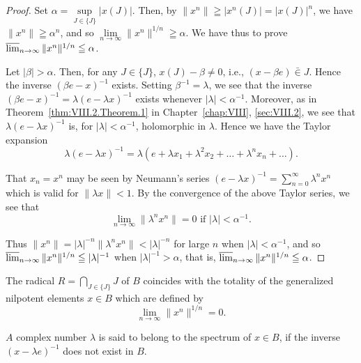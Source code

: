 \begin{proof}
 Set $\alpha = \sup\limits_{J \in \{J\}} |x(J)|$. Then, by $\|x^n\| \geqq |x^n(J)| = |x(J)|^n$, we have $\|x^n\| \geqq \alpha^n$, and so $\lim\limits_{n \to \infty} \|x^n\|^{1/n} \geqq \alpha$. We have thus to prove $\varlimsup\limits_{n \to \infty} \|x^n\|^{1/n} \leqq \alpha$. 

Let $|\beta| > \alpha$. Then, for any $J \in \{J\}$, $x(J) - \beta \neq 0$, i.e., $(x - \beta e) \bar{\in} J$. Hence the inverse $(\beta e - x)^{-1}$ exists. Setting $\beta^{-1} = \lambda$, we see that the inverse $(\beta e - x)^{-1} = \lambda (e - \lambda x)^{-1}$ exists whenever $|\lambda| < \alpha^{-1}$. Moreover, as in Theorem~\ref{thm:VIII.2.Theorem.1} in Chapter~\ref{chap:VIII}, \ref{sec:VIII.2}, we see that $\lambda (e - \lambda x)^{-1}$ is, for $|\lambda| < \alpha^{-1}$, holomorphic in $\lambda$. Hence we have the Taylor expansion 
\[
\lambda (e - \lambda x) ^{-1} = \lambda (e + \lambda x _{1} + \lambda^{2} x _{2} + \dots + \lambda^{n} x _{n} + \dots).
\]

That $x_{n} = x^{n}$ may be seen by Neumann's series $(e - \lambda x)^{-1} = \sum\limits_{n=0}^{\infty} \lambda^{n} x^{n}$ which is valid for $\|\lambda x\| < 1$. By the convergence of the above Taylor series, we see that 
\[
\lim\limits _{n \rightarrow \infty} \| \lambda^{n} x ^{n} \| = 0 \text{ if } | \lambda | < \alpha^{-1}.
\]

Thus $\|x^n \| = |\lambda|^{-n}\|\lambda^n x^n \| < |\lambda|^{-n}$ for large $n$ when $|\lambda| < \alpha^{-1}$, and so $\varlimsup\limits_{n \to \infty} \|x^n \|^{1/n} \leqq |\lambda|^{-1}$ when $|\lambda|^{-1} > \alpha$, that is, $\varlimsup\limits_{n \to \infty} \|x^n \|^{1/n} \leqq \alpha$. 
\end{proof}

\begin{corollaryu} The radical $R = \bigcap\limits_{J \in \{J\}} J$ of $B$ coincides with the totality of the generalized nilpotent elements $x \in B$ which are defined by 
\begin{equation}\label{eq:XI.2.2}
\lim\limits _{n \rightarrow \infty} \| x ^{n} \| ^{1/n} = 0.
\end{equation}
\end{corollaryu}

\begin{definition}\label{def:XI.2.Definition.2} $A$ complex number $\lambda$ is said to belong to the spectrum of $x \in B$, if the inverse $(x - \lambda e)^{-1}$ does not exist in $B$. 
\end{definition}

